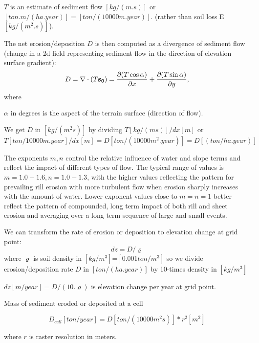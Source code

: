 \noindent
$T$ is an estimate of sediment flow $[kg/(m.s)]$ or
$[ton.m/(ha.year)] = [ton/(10000m.year)]$.
(rather than soil loss E $[kg/(m^2.s)]$).

\noindent
The net erosion/deposition $D$ is then computed as a divergence of sediment
flow (change in a 2d field representing sediment flow in the direction of
elevation surface gradient):
$$
D=\nabla\cdot (T{\bf s_0}) = {\partial (T \cos \alpha) \over {\partial x}} +
{\partial (T \sin \alpha) \over {\partial y}},
$$
\noindent
where

\noindent
$\alpha$ in degrees is the aspect of the terrain surface (direction of flow).

\noindent
We get $D$ in $[kg/(m^2s)]$ by dividing $T[kg/(ms)] / dx[m]$
or $T[ton/10000m.year]/dx[m]=D[ton/(10000m^2. year)]=D[(ton/ha.year)]$

The exponents $m,n$ control the relative influence of water and slope
terms and reflect the impact of different types of flow. The typical range of
values is $m=1.0-1.6, n=1.0-1.3$, with the higher values reflecting the pattern
for prevailing rill erosion with more turbulent flow when erosion sharply
increases with the amount of water.  Lower exponent values close to $m=n=1$
better reflect the pattern of compounded, long term impact of both rill and
sheet erosion and averaging over a long term sequence of large and small
events.

We can transform the rate of erosion or deposition to
elevation change at grid point:
$$
dz=D/\varrho
$$
\noindent
where
$\varrho$ is soil density in $[kg/m^3]$=$[0.001 ton / m^3]$ so we divide
erosion/deposition rate $D$ in $[ton/(ha.year)]$ by 10-times density
in $[kg/m^3]$

\noindent
$dz[m/year]=D/(10.\varrho)$ is elevation change per year at grid point.

\noindent
Mass of sediment eroded or deposited at a cell

$$D_{cell}[ton/year]=D[ton/(10000m^2s)]*r^2[m^2]$$

\noindent
where $r$ is raster resolution in meters.

\bye
